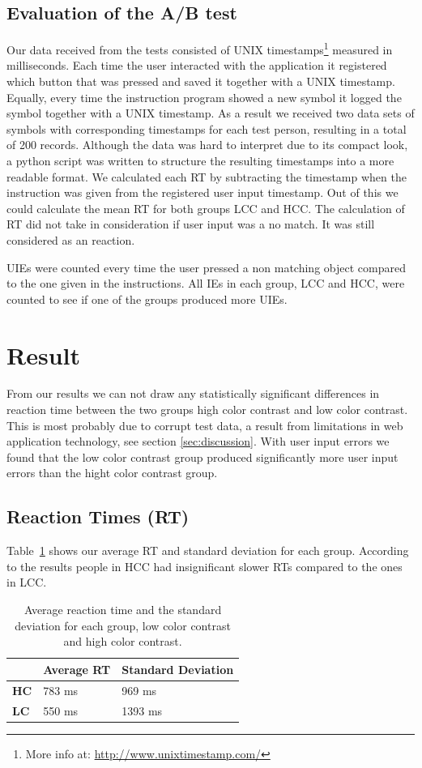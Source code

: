 \documentclass[runningheads,a4paper]{llncs}
\begin{document}
\subsection{Evaluation of the A/B test}
Our data received from the tests consisted of UNIX timestamps\footnote{More info at: \url{http://www.unixtimestamp.com/}} measured in milliseconds. Each time the user interacted with the application it registered which button that was pressed and saved it together with a UNIX timestamp. Equally, every time the instruction program showed a new symbol it logged the symbol together with a UNIX timestamp. As a result we received two data sets of symbols with corresponding timestamps for each test person, resulting in a total of 200 records. Although the data was hard to interpret due to its compact look, a python script was written to structure the resulting timestamps into a more readable format. We calculated each RT by subtracting the timestamp when the instruction was given from the registered user input timestamp. Out of this we could calculate the mean RT for both groups LCC and HCC. The calculation of RT did not take in consideration if user input was a no match. It was still considered as an reaction.

UIEs were counted every time the user pressed a non matching object compared to the one given in the instructions. All IEs in each group, LCC and HCC, were counted to see if one of the groups produced more UIEs.

\section{Result}
From our results we can not draw any statistically significant differences in reaction time between the two groups high color contrast and low color contrast. This is most probably due to corrupt test data, a result from limitations in web application technology, see section \ref{sec:discussion}. With user input errors we found that the low color contrast group produced significantly more user input errors than the hight color contrast group.

\subsection{Reaction Times (RT)}
Table~\ref{tab:groupRT} shows our average RT and standard deviation for each group. According to the results people in HCC had insignificant slower RTs compared to the ones in LCC.

\begin{table}[]
	\centering
	\setlength{\tabcolsep}{1em}
	\setlength\extrarowheight{1em}
	\begin{tabular}{l|l|l}
		\textbf{} & \textbf{Average RT} & \textbf{Standard Deviation} \\ \hline
		\textbf{HC} & 783 ms & 969 ms \\ \hline
		\textbf{LC} & 550 ms & 1393 ms
	\end{tabular}
	\caption{Average reaction time and the standard deviation for each group, low color contrast and high color contrast.}
	\label{tab:groupRT}
\end{table}
\end{document}
